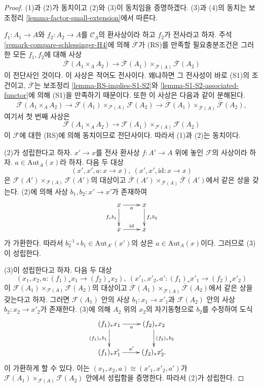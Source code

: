 \begin{proof}
(1)과 (2)가 동치이고 (2)와 (3)이 동치임을 증명하겠다.
(3)과 (4)의 동치는 보조정리
\ref{lemma-factor-small-extension}에서 따른다.

\medskip\noindent
$f_1: A_1 \to A$와 $f_2: A_2 \to A$를
$\mathcal{C}_\Lambda$의 환사상이라 하고 $f_2$가 전사라고 하자.
주석 \ref{remark-compare-schlessinger-H4}에 의해
$\overline{\mathcal{F}}$가 (RS)를 만족할 필요충분조건은
그러한 모든 $f_1, f_2$에 대해 사상
$$
\overline{\mathcal{F}}(A_1 \times_A A_2) \to \overline{\mathcal
F}(A_1) \times_{\overline{\mathcal{F}}(A)} \overline{\mathcal{F}}(A_2)
$$
이 전단사인 것이다.
이 사상은 적어도 전사이다. 왜냐하면 그 전사성이 바로 (S1)의 조건이고,
$\overline{\mathcal{F}}$는 보조정리
\ref{lemma-RS-implies-S1-S2}와
\ref{lemma-S1-S2-associated-functor}에 의해 (S1)을 만족하기 때문이다.
또한 이 사상은 다음과 같이 분해된다.
$$
\overline{\mathcal{F}}(A_1 \times_A A_2)
\longrightarrow
\overline{\mathcal{F}(A_1) \times_{\mathcal{F}(A)} \mathcal{F}(A_2)}
\longrightarrow
\overline{\mathcal{F}}(A_1) \times_{\overline{\mathcal{F}}(A)}
\overline{\mathcal{F}}(A_2),
$$
여기서 첫 번째 사상은
$$
\mathcal{F}(A_1 \times_A A_2)
\longrightarrow
\mathcal{F}(A_1) \times_{\mathcal{F}(A)} \mathcal{F}(A_2)
$$
이 $\mathcal{F}$에 대한 (RS)에 의해 동치이므로 전단사이다.
따라서 (1)과 (2)는 동치이다.

\medskip\noindent
(2)가 성립한다고 하자.
$x' \to x$를 전사 환사상 $f: A' \to A$ 위에 놓인
$\mathcal{F}$의 사상이라 하자.
$a \in \text{Aut}_A(x)$라 하자. 다음 두 대상
$$
(x', x', a : x \to x), \ (x', x', \text{id} : x \to x)
$$
은
$\mathcal{F}(A') \times_{\mathcal{F}(A)} \mathcal{F}(A')$의 대상이고
$\overline{\mathcal{F}}(A') \times_{\overline{\mathcal{F}}(A)}
\overline{\mathcal{F}}(A')$에서 같은 상을 갖는다.
(2)에 의해 사상 $b_1, b_2 : x' \to x'$가 존재하여 %
$$
\xymatrix{
x \ar[r]_a \ar[d]_{f_*b_1} & x \ar[d]^{f_*b_2} \\
x \ar[r]^{\text{id}} & x
}
$$
가 가환한다. 따라서
$b_2^{-1} \circ b_1 \in \text{Aut}_{A'}(x')$의 상은
$a \in \text{Aut}_A(x)$이다. 그러므로 (3)이 성립한다.

\medskip\noindent
(3)이 성립한다고 하자. 다음 두 대상
$$
(x_1, x_2, a : (f_1)_*x_1 \to (f_2)_*x_2),
\ (x'_1, x'_2, a' : (f_1)_*x'_1 \to (f_2)_*x'_2)
$$
이
$\mathcal{F}(A_1) \times_{\mathcal{F}(A)} \mathcal{F}(A_2)$의 대상이고
$\overline{\mathcal{F}}(A_1) \times_{\overline{\mathcal{F}}(A)}
\overline{\mathcal{F}}(A_2)$에서 같은 상을 갖는다고 하자.
그러면 $\mathcal{F}(A_1)$ 안의 사상 $b_1: x_1 \to x'_1$과
$\mathcal F(A_2)$ 안의 사상 $b_2: x_2 \to x'_2$가 존재한다.
(3)에 의해 $A_2$ 위의 $x_2$의 자기동형으로 $b_2$를 수정하여 도식
$$
\xymatrix{
(f_1)_*x_1 \ar[r]_a \ar[d]_{(f_1)_*b_1} & (f_2)_*x_2 \ar[d]^{(f_2)_*b_2} \\
(f_1)_*x'_1 \ar[r]^{a'} & (f_2)_*x'_2.
}
$$
이 가환하게 할 수 있다. 이는
$(x_1, x_2, a) \cong (x'_1, x'_2, a')$가
$\overline{\mathcal{F}(A_1) \times_{\mathcal{F}(A)} \mathcal{F}(A_2)}$
안에서 성립함을 증명한다. %
따라서 (2)가 성립한다.
\end{proof}

